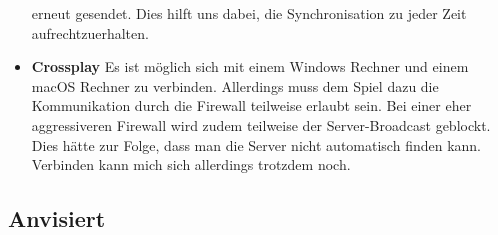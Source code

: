 \begin{itemize}
        erneut gesendet. Dies hilft uns dabei, die Synchronisation zu jeder Zeit aufrechtzuerhalten.
    \item \textbf{Crossplay}
        Es ist möglich sich mit einem Windows Rechner und einem macOS Rechner zu verbinden. Allerdings muss dem Spiel dazu die Kommunikation durch die Firewall teilweise erlaubt sein.
        Bei einer eher aggressiveren Firewall wird zudem teilweise der Server-Broadcast geblockt. Dies hätte zur Folge, dass man die Server nicht automatisch finden kann. 
        Verbinden kann mich sich allerdings trotzdem noch.   
\end{itemize}

\subsection{Anvisiert}
